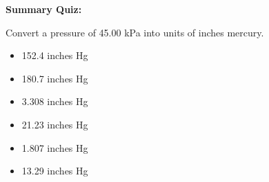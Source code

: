 





\vfil \eject

\noindent
{\bf Summary Quiz:}

Convert a pressure of 45.00 kPa into units of inches mercury.

\begin{itemize}
\item{} 152.4 inches Hg
\vskip 5pt 
\item{} 180.7 inches Hg
\vskip 5pt 
\item{} 3.308 inches Hg
\vskip 5pt 
\item{} 21.23 inches Hg
\vskip 5pt 
\item{} 1.807 inches Hg
\vskip 5pt 
\item{} 13.29 inches Hg
\end{itemize}






